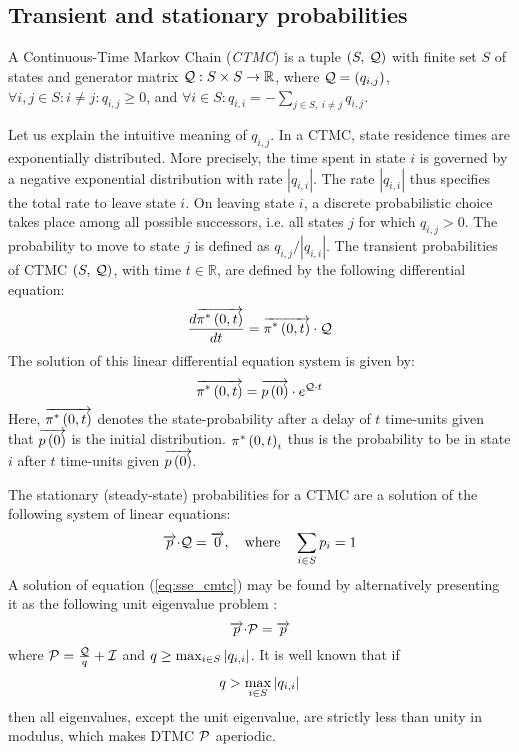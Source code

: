 \documentclass{entcs}
\newcommand{\SubSection}[1]{\subsection{#1}}
\begin{document}
	\SubSection{Transient and stationary probabilities}
		\begin{definition}
			A Continuous-Time Markov Chain (\emph{CTMC}) is a tuple $\left( S,\: \mathcal{Q} \right)$ with finite set $S$ of states and generator matrix $\mathcal{Q} : S \times S \rightarrow \mathbb{R}$, where $\mathcal{Q}=\left(q_{i,j}\right)$, $\forall i,j \in S : i \neq j : q_{i,j} \geq 0$, and $\forall i \in S : q_{i,i} = - \sum_{j \in S, \: i \neq j} q_{i,j}$.
		\end{definition}
		Let us explain the intuitive meaning of $q_{i,j}$.  In a CTMC, state residence times are exponentially distributed.  More precisely, the time spent in state $i$ is governed by a negative exponential distribution with rate $|q_{i,i}|$.  The rate $|q_{i,i}|$ thus specifies the total rate to leave state $i$.  On leaving state $i$, a discrete probabilistic choice takes place among all possible successors, i.e. all states $j$ for which $q_{i,j} > 0$.  The probability to move to state $j$ is defined as $q_{i,j} / |q_{i,i}|$.  The transient probabilities of CTMC $\left( S,\: \mathcal{Q} \right)$, with time $t \in \mathbb{R}$, are defined by the following differential equation:
		\begin{equation}
			\frac{d \overrightarrow{\pi^{*} \left(0, t \right )}}{dt} = \overrightarrow{\pi^{*} \left(0, t \right )} \cdot \mathcal{Q} \nonumber
		\end{equation}
		The solution of this linear differential equation system is given by:
		\begin{equation}
			\overrightarrow{\pi^{*} \left(0, t \right )} = \overrightarrow{p \left( 0 \right)} \cdot e^{\mathcal{Q}{\cdot}t}
			\label{eq:transient}
		\end{equation}
		Here, $\overrightarrow{\pi^{*} \left(0, t \right )}$ denotes the state-probability after a delay of $t$ time-units given that  $\overrightarrow{p \left( 0 \right)}$ is the initial distribution.  $\pi^{*} \left(0, t \right )_{i}$ thus is the probability to be in state $i$ after $t$ time-units given $\overrightarrow{p \left( 0 \right)}$.

		The stationary (steady-state) probabilities for a CTMC are a solution of the following system of linear equations:
		\begin{equation}
			\overrightarrow{p} {\cdot} \mathcal{Q} = \overrightarrow{0}, \quad \text{where} \quad \sum_{i \in S} p_{i} = 1
			\label{eq:sse_cmtc}
		\end{equation}
		A solution of equation (\ref{eq:sse_cmtc}) may be found by alternatively presenting it as the following unit eigenvalue problem \cite{Stewart_ACM78}:
		\begin{equation}
			\overrightarrow{p}{\cdot}\mathcal{P} = \overrightarrow{p}
			\nonumber
		\end{equation}
		where $\mathcal{P}=\frac{\mathcal{Q}}{q}+\mathcal{I}$ and $q \geq \max_{i \in S}| q_{i,i} |$.  It is well known \cite{Stewart_ACM78} that if
		\begin{equation}
			q > \max_{i \in S} |q_{i,i}|
			\nonumber
		\end{equation}
		then all eigenvalues, except the unit eigenvalue, are strictly less than unity in modulus, which makes DTMC $\mathcal{P}$ aperiodic.
\end{document}
